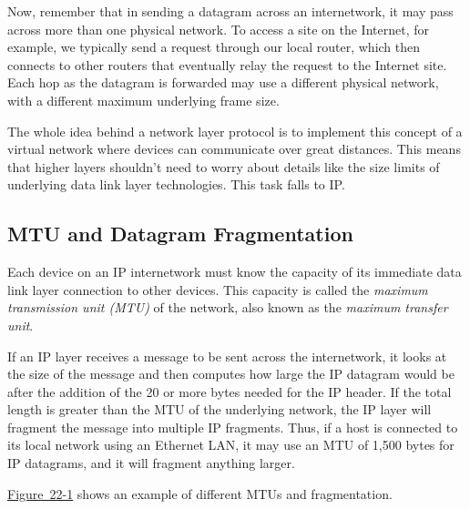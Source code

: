 \documentclass[b5paper,11pt]{memoir}
\begin{document}
Now, remember that in sending a datagram across an internetwork, it may
pass across more than one physical network. To access a site on the
Internet, for example, we typically send a request through our local
router, which then connects to other routers that eventually relay the
request to the Internet site. Each hop as the datagram is forwarded may
use a different physical network, with a different maximum underlying
frame size.

The whole idea behind a network layer protocol is to implement this
concept of a virtual network where devices can communicate over great
distances. This means that higher layers shouldn't need to worry about
details like the size limits of underlying data link layer technologies.
This task falls to
\protect\hypertarget{ch22.htmlux5cux23idx-CHP-22-0796}{}{}IP.

\subsection[MTU and Datagram
Fragmentation]{\texorpdfstring{\protect\hypertarget{ch22.htmlux5cux23mtu_and_datagram_fragmentation}{}{}MTU
and Datagram Fragmentation}{MTU and Datagram Fragmentation}}

\protect\hypertarget{ch22.htmlux5cux23idx-CHP-22-0797}{}{}\protect\hypertarget{ch22.htmlux5cux23idx-CHP-22-0798}{}{}
Each device on an IP internetwork must know the capacity of its
immediate data link layer connection to other devices. This capacity is
called the
\protect\hypertarget{ch22.htmlux5cux23idx-CHP-22-0799}{}{}{\emph{maximum
transmission unit
(MTU)}}\protect\hypertarget{ch22.htmlux5cux23idx-CHP-22-0800}{}{} of the
network, also known as the
\protect\hypertarget{ch22.htmlux5cux23idx-CHP-22-0801}{}{}{\emph{maximum
transfer unit}}.

If an IP layer receives a message to be sent across the internetwork, it
looks at the size of the message and then computes how large the IP
datagram would be after the addition of the 20 or more bytes needed for
the IP header. If the total length is greater than the MTU of the
underlying network, the IP layer will fragment the message into multiple
IP fragments. Thus, if a host is connected to its local network using an
Ethernet LAN, it may use an MTU of 1,500 bytes for IP datagrams, and it
will fragment anything larger.

\protect\hyperlink{ch22.htmlux5cux23ip_maximum_transmission_unit_mtu_and_fra}{Figure~22-1}
shows an example of different MTUs and fragmentation.
\end{document}
